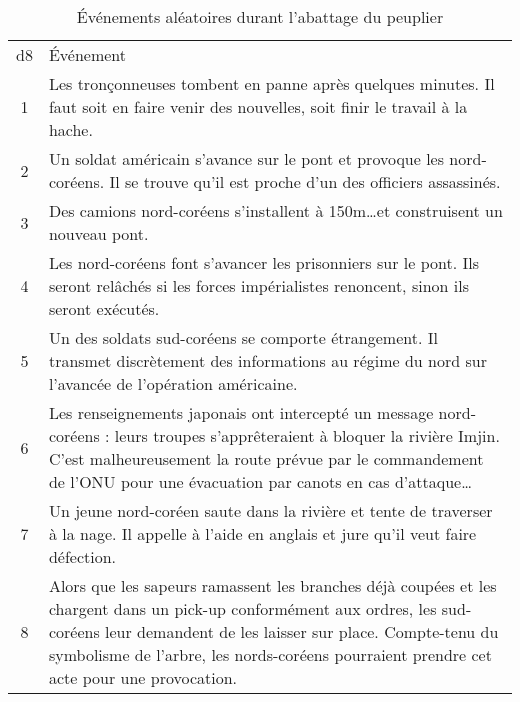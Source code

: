 \begin{table}
	\caption{Événements aléatoires durant l'abattage du peuplier}
	\label{table:peuplier}
	\begin{tabularx}{0.9\textwidth}{cX}
	d8 & Événement\\
	1  & Les tronçonneuses tombent en panne après quelques minutes. Il faut soit en faire venir des nouvelles, soit finir le travail à la hache.\\
	2  & Un soldat américain s'avance sur le pont et provoque les nord-coréens. Il se trouve qu'il est proche d'un des officiers assassinés.\\
	3  & Des camions nord-coréens s'installent à 150m\dots et construisent un nouveau pont.\\
	4  & Les nord-coréens font s'avancer les prisonniers sur le pont. Ils seront relâchés si les forces impérialistes renoncent, sinon ils seront exécutés.\\
	5  & Un des soldats sud-coréens se comporte étrangement. Il transmet discrètement des informations au régime du nord sur l'avancée de l'opération américaine.\\
	6  & Les renseignements japonais ont intercepté un message nord-coréens : leurs troupes s'apprêteraient à bloquer la rivière Imjin. C'est malheureusement la route prévue par le commandement de l'ONU pour une évacuation par canots en cas d'attaque\dots\\
	7  & Un jeune nord-coréen saute dans la rivière et tente de traverser à la nage. Il appelle à l'aide en anglais et jure qu'il veut faire défection.\\
	8  & Alors que les sapeurs ramassent les branches déjà coupées et les chargent dans un pick-up conformément aux ordres, les sud-coréens leur demandent de les laisser sur place. Compte-tenu du symbolisme de l'arbre, les nords-coréens pourraient prendre cet acte pour une provocation.\\
	\end{tabularx}
\end{table}
